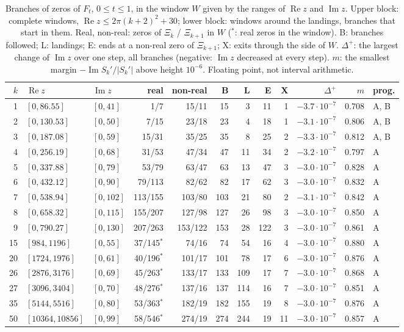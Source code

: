 \documentclass[11pt]{article}
\theoremstyle{plain}
\theoremstyle{definition}
\theoremstyle{remark}
\newcommand{\re}{\operatorname{Re}}
\newcommand{\im}{\operatorname{Im}}
\begin{document}
\begin{table}[ht]
\centering\footnotesize
\setlength{\tabcolsep}{4pt}
\begin{tabular}{rllrrrrrrrrl}
\toprule
$k$ & $\re z$ & $\im z$ & real & non-real & B & L & E & X & $\Delta^+$ & $m$ & prog.\\
\midrule
1 & $[0, 86.55]$ & $[0, 41]$ & 1/7 & 15/11 & 15 & 3 & 11 & 1 & $-3.7\cdot10^{-7}$ & 0.708 & A, B \\
2 & $[0, 130.53]$ & $[0, 50]$ & 7/15 & 23/18 & 23 & 4 & 18 & 1 & $-3.1\cdot10^{-7}$ & 0.806 & A, B \\
3 & $[0, 187.08]$ & $[0, 59]$ & 15/31 & 35/25 & 35 & 8 & 25 & 2 & $-3.3\cdot10^{-7}$ & 0.812 & A, B \\
4 & $[0, 256.19]$ & $[0, 68]$ & 31/53 & 47/34 & 47 & 11 & 34 & 2 & $-3.2\cdot10^{-7}$ & 0.797 & A \\
5 & $[0, 337.88]$ & $[0, 79]$ & 53/79 & 63/47 & 63 & 13 & 47 & 3 & $-3.0\cdot10^{-7}$ & 0.828 & A \\
6 & $[0, 432.12]$ & $[0, 90]$ & 79/113 & 82/62 & 82 & 17 & 62 & 3 & $-3.0\cdot10^{-7}$ & 0.832 & A \\
7 & $[0, 538.94]$ & $[0, 102]$ & 113/155 & 103/80 & 103 & 21 & 80 & 2 & $-3.1\cdot10^{-7}$ & 0.842 & A \\
8 & $[0, 658.32]$ & $[0, 115]$ & 155/207 & 127/98 & 127 & 26 & 98 & 3 & $-3.0\cdot10^{-7}$ & 0.850 & A \\
9 & $[0, 790.27]$ & $[0, 130]$ & 207/263 & 153/122 & 153 & 28 & 122 & 3 & $-3.0\cdot10^{-7}$ & 0.861 & A \\
\midrule
15 & $[984, 1196]$ & $[0, 55]$ & 37/145$^*$ & 74/16 & 74 & 54 & 16 & 4 & $-3.0\cdot10^{-7}$ & 0.880 & A \\
20 & $[1724, 1976]$ & $[0, 61]$ & 40/196$^*$ & 101/17 & 101 & 78 & 17 & 6 & $-3.0\cdot10^{-7}$ & 0.876 & A \\
26 & $[2876, 3176]$ & $[0, 69]$ & 45/263$^*$ & 133/17 & 133 & 109 & 17 & 7 & $-3.0\cdot10^{-7}$ & 0.868 & A \\
27 & $[3096, 3404]$ & $[0, 70]$ & 48/276$^*$ & 137/16 & 137 & 114 & 16 & 7 & $-3.0\cdot10^{-7}$ & 0.851 & A \\
35 & $[5144, 5516]$ & $[0, 80]$ & 53/363$^*$ & 182/19 & 182 & 155 & 19 & 8 & $-3.0\cdot10^{-7}$ & 0.876 & A \\
50 & $[10364, 10856]$ & $[0, 99]$ & 58/546$^*$ & 274/19 & 274 & 244 & 19 & 11 & $-3.0\cdot10^{-7}$ & 0.857 & A \\
\bottomrule
\end{tabular}
\caption{Branches of zeros of $F_t$, $0 \le t \le 1$, in the window $W$
given by the ranges of $\re z$ and $\im z$. Upper block: complete windows,
$\re z \le 2\pi(k+2)^2 + 30$; lower block: windows around the landings,
branches that start in them. Real, non-real: zeros of $\Xi_k$ / $\Xi_{k+1}$ in
$W$ (${}^*$: real zeros in the window). B: branches followed; L: landings;
E: ends at a non-real zero of $\Xi_{k+1}$; X: exits through the side of $W$.
$\Delta^+$: the largest change of $\im z$ over one step, all branches
(negative: $\im z$ decreased at every step). $m$: the smallest margin
$-\im S_k'/|S_k'|$ above height $10^{-6}$. Floating point, not interval
arithmetic.}
\label{tab:census}
\end{table}
\end{document}

